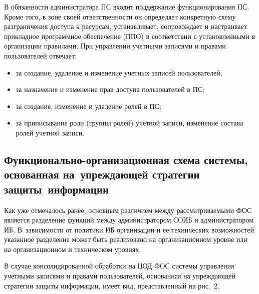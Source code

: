 \begin{multicols}{2}
       В обязанности администратора ПС входит поддержание функционирования ПС. 
Кроме того, в зоне своей ответственности он определяет конкретную схему разграничения 
доступа к ресурсам, устанавливает, сопровождает и настраивает прикладное программное 
обеспечение (ППО) в соответствии с уста\-нов\-лен\-ны\-ми в организации правилами. При 
управлении учетными записями и правами пользователей отвечает: 
       \begin{itemize}
\item за создание, удаление и изменение учетных записей пользователей; 
\item за назначение и изменение прав доступа пользователей в ПС; 
\item за создание, изменение и удаление ролей в ПС; 
\item за приписывание роли (группы ролей) учетной записи, изменение состава ролей 
учетной за\-писи.
\end{itemize}

\subsection{Функционально-организационная схема системы, основанная на~упреждающей стратегии 
защиты~информации}
       
       Как уже отмечалось ранее, основным различием между рассматриваемыми ФОС 
является разделение функций между администратором СОИБ и администратором ИБ. 
В~зависимости от политики ИБ организации и ее технических возможностей указанное 
разделение может быть реализовано на организационном уровне или на организационном 
и техническом уровнях.
       
       В случае консолидированной обработки на ЦОД ФОС сис\-те\-мы управ\-ле\-ния 
учетными записями и правами пользователей, основанная на упреждающей стратегии 
защиты информации, имеет вид, представленный на рис.~2.

\begin{figure*} %
\vspace*{1pt}
 \begin{center}
 \mbox{%
 \epsfxsize=159.191mm
 }
 \end{center}
 \vspace*{-9pt}
\end{figure*}
       

\end{multicols}

